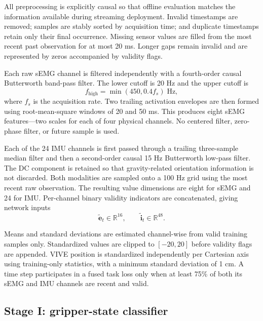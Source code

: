 All preprocessing is explicitly causal so that offline evaluation matches the
information available during streaming deployment.  Invalid timestamps are
removed; samples are stably sorted by acquisition time; and duplicate
timestamps retain only their final occurrence.  Missing sensor values are
filled from the most recent past observation for at most 20 ms.  Longer gaps
remain invalid and are represented by zeros accompanied by validity flags.

Each raw sEMG channel is filtered independently with a fourth-order causal
Butterworth band-pass filter.  The lower cutoff is 20 Hz and the upper cutoff
is
\begin{equation}
    f_{\mathrm{high}}=\min(450,0.4f_s)\;\mathrm{Hz},
\end{equation}
where $f_s$ is the acquisition rate.  Two trailing activation envelopes are
then formed using root-mean-square windows of 20 and 50 ms.  This produces eight
sEMG features---two scales for each of four physical channels.  No centered
filter, zero-phase filter, or future sample is used.

Each of the 24 IMU channels is first passed through a trailing three-sample
median filter and then a second-order causal 15 Hz Butterworth low-pass filter.
The DC component is retained so that gravity-related orientation information is
not discarded.  Both modalities are sampled onto a 100 Hz grid using the most
recent raw observation.  The resulting value dimensions are eight for sEMG and
24 for IMU.  Per-channel binary validity indicators are concatenated, giving
network inputs
\begin{equation}
    \tilde{\mathbf{e}}_t\in\mathbb{R}^{16},\qquad
    \tilde{\mathbf{i}}_t\in\mathbb{R}^{48}.
\end{equation}

Means and standard deviations are estimated channel-wise from valid training
samples only.  Standardized values are clipped to $[-20,20]$ before validity
flags are appended.  VIVE position is standardized independently per Cartesian
axis using training-only statistics, with a minimum standard deviation of
1 cm.  A time step participates in a fused task loss only when at least 75\% of
both its sEMG and IMU channels are recent and valid.

\subsection{Stage I: gripper-state classifier}
\label{subsec:classifier}

